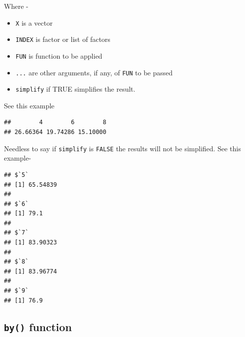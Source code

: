 \documentclass[
]{book}
\newenvironment{Shaded}{\begin{snugshade}}{\end{snugshade}}
\newcommand{\AttributeTok}[1]{\textcolor[rgb]{0.13,0.29,0.53}{#1}}
\newcommand{\CommentTok}[1]{\textcolor[rgb]{0.56,0.35,0.01}{\textit{#1}}}
\newcommand{\ConstantTok}[1]{\textcolor[rgb]{0.56,0.35,0.01}{#1}}
\newcommand{\FunctionTok}[1]{\textcolor[rgb]{0.13,0.29,0.53}{\textbf{#1}}}
\newcommand{\NormalTok}[1]{#1}
\newcommand{\SpecialCharTok}[1]{\textcolor[rgb]{0.81,0.36,0.00}{\textbf{#1}}}
\providecommand{\tightlist}{%
  \setlength{\itemsep}{0pt}\setlength{\parskip}{0pt}}
\begin{document}
Where -

\begin{itemize}
\tightlist
\item
  \texttt{X} is a vector
\item
  \texttt{INDEX} is factor or list of factors
\item
  \texttt{FUN} is function to be applied
\item
  \texttt{...} are other arguments, if any, of \texttt{FUN} to be passed
\item
  \texttt{simplify} if TRUE simplifies the result.
\end{itemize}

See this example

\begin{Shaded}
\end{Shaded}

\begin{verbatim}
##        4        6        8 
## 26.66364 19.74286 15.10000
\end{verbatim}

Needless to say if \texttt{simplify} is \texttt{FALSE} the results will not be simplified. See this example-

\begin{Shaded}
\end{Shaded}

\begin{verbatim}
## $`5`
## [1] 65.54839
## 
## $`6`
## [1] 79.1
## 
## $`7`
## [1] 83.90323
## 
## $`8`
## [1] 83.96774
## 
## $`9`
## [1] 76.9
\end{verbatim}

\hypertarget{by-function}{%
\subsection{\texorpdfstring{\texttt{by()} function}{by() function}}\label{by-function}}
\end{document}
